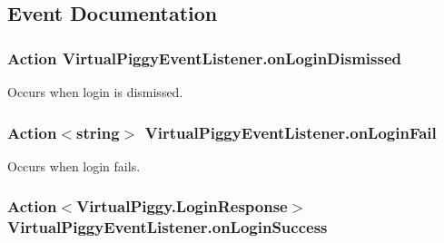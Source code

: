 \subsection{Event Documentation}
\hypertarget{class_virtual_piggy_event_listener_ad0e8ac1d1b94df9f5dc1e3e7ec755ecc}{
\subsubsection[{on\-Login\-Dismissed}]{\setlength{\rightskip}{0pt plus 5cm}Action Virtual\-Piggy\-Event\-Listener.\-on\-Login\-Dismissed\hspace{0.3cm}{\ttfamily [static]}}}\label{class_virtual_piggy_event_listener_ad0e8ac1d1b94df9f5dc1e3e7ec755ecc}


Occurs when login is dismissed. 

\hypertarget{class_virtual_piggy_event_listener_a580e126cb0048aaa4daafa0de836f4bb}{
\subsubsection[{on\-Login\-Fail}]{\setlength{\rightskip}{0pt plus 5cm}Action$<$string$>$ Virtual\-Piggy\-Event\-Listener.\-on\-Login\-Fail\hspace{0.3cm}{\ttfamily [static]}}}\label{class_virtual_piggy_event_listener_a580e126cb0048aaa4daafa0de836f4bb}


Occurs when login fails. 

\hypertarget{class_virtual_piggy_event_listener_a37e2f432ebe9efec24f8d21c8e9433c7}{
\subsubsection[{on\-Login\-Success}]{\setlength{\rightskip}{0pt plus 5cm}Action$<${\bf Virtual\-Piggy.\-Login\-Response}$>$ Virtual\-Piggy\-Event\-Listener.\-on\-Login\-Success\hspace{0.3cm}{\ttfamily [static]}}}\label{class_virtual_piggy_event_listener_a37e2f432ebe9efec24f8d21c8e9433c7}


